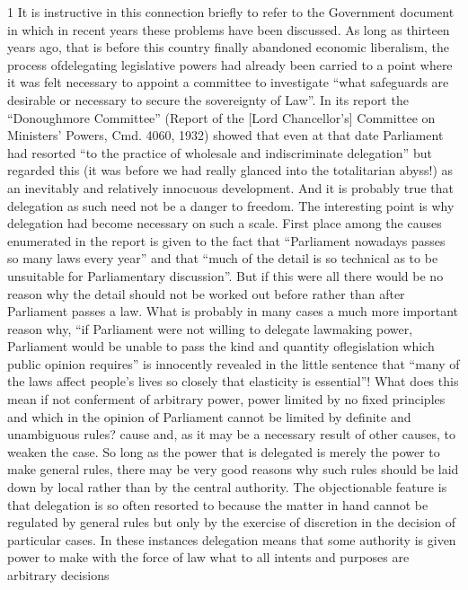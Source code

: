 \documentclass[11pt,openany]{book}
\begin{document}
1 It is instructive in this connection briefly to refer to the Government document in which in recent years these problems have been discussed. As long as thirteen years ago, that is before this country finally abandoned economic liberalism, the process ofdelegating legislative powers had already been carried to a point where it was felt necessary to appoint a committee to investigate ``what safeguards are desirable or necessary to secure the sovereignty of Law''. In its report the ``Donoughmore Committee'' (Report of the [Lord Chancellor's] Committee on Ministers' Powers, Cmd. 4060, 1932) showed that even at that date Parliament had resorted ``to the practice of wholesale and indiscriminate delegation'' but regarded this (it was before we had really glanced into the totalitarian abyss!) as an inevitably and relatively innocuous development. And it is probably true that delegation as such need not be a danger to freedom. The interesting point is why delegation had become necessary on such a scale. First place among the causes enumerated in the report is given to the fact that ``Parliament nowadays passes so many laws every year'' and that ``much of the detail is so technical as to be unsuitable for Parliamentary discussion''. But if this were all there would be no reason why the detail should not be worked out before rather than after Parliament passes a law. What is probably in many cases a much more important reason why, ``if Parliament were not willing to delegate lawmaking power, Parliament would be unable to pass the kind and quantity oflegislation which public opinion requires'' is innocently revealed in the little sentence that ``many of the laws affect people's lives so closely that elasticity is essential''! What does this mean if not conferment of arbitrary power, power limited by no fixed principles and which in the opinion of Parliament cannot be limited by definite and unambiguous rules? cause and, as it may be a necessary result of other causes, to weaken the case. So long as the power that is delegated is merely the power to make general rules, there may be very good reasons why such rules should be laid down by local rather than by the central authority. The objectionable feature is that delegation is so often resorted to because the matter in hand cannot be regulated by general rules but only by the exercise of discretion in the decision of particular cases. In these instances delegation means that some authority is given power to make with the force of law what to all intents and purposes are arbitrary decisions
\end{document}
